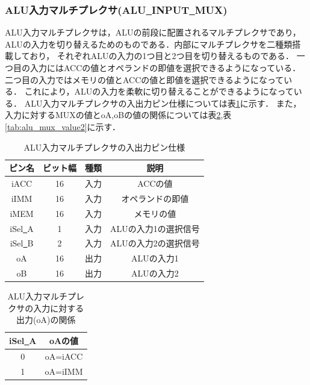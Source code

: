 \documentclass[a4paper,11pt]{ltjsarticle}
\begin{document}
\subsubsection{ALU入力マルチプレクサ(ALU\underline{~}INPUT\underline{~}MUX)}
ALU入力マルチプレクサは，ALUの前段に配置されるマルチプレクサであり，
ALUの入力を切り替えるためのものである．内部にマルチプレクサを二種類搭載しており，
それぞれALUの入力の1つ目と2つ目を切り替えるものである．
一つ目の入力にはACCの値とオペランドの即値を選択できるようになっている．
二つ目の入力ではメモリの値とACCの値と即値を選択できるようになっている．
これにより，ALUの入力を柔軟に切り替えることができるようになっている．
ALU入力マルチプレクサの入出力ピン仕様については表\ref{tab:alu_mux}に示す．
また，入力に対するMUXの値とoA,oBの値の関係については表\ref{tab:alu_mux_value},表\ref{tab:alu_mux_value2}に示す．
\begin{table}[H]
    \centering
    \caption{ALU入力マルチプレクサの入出力ピン仕様}
    \label{tab:alu_mux}
    \begin{tabular}{|c|c|c|c|}
        \hline
        ピン名                & ビット幅 & 種類 & 説明           \\
        \hline
        iACC               & 16   & 入力 & ACCの値        \\
        \hline
        iIMM               & 16   & 入力 & オペランドの即値     \\
        \hline
        iMEM               & 16   & 入力 & メモリの値        \\
        \hline
        iSel\underline{~}A & 1    & 入力 & ALUの入力1の選択信号 \\
        \hline
        iSel\underline{~}B & 2    & 入力 & ALUの入力2の選択信号 \\
        \hline
        oA                 & 16   & 出力 & ALUの入力1      \\
        \hline
        oB                 & 16   & 出力 & ALUの入力2      \\
        \hline
    \end{tabular}
\end{table}
\begin{table}[H]
    \centering
    \caption{ALU入力マルチプレクサの入力に対する出力(oA)の関係}
    \label{tab:alu_mux_value}
    \begin{tabular}{|c|c|}
        \hline
        iSel\underline{~}A & oAの値    \\
        \hline
        0                  & oA=iACC \\
        \hline
        1                  & oA=iIMM \\
        \hline
    \end{tabular}
\end{table}
\end{document}
